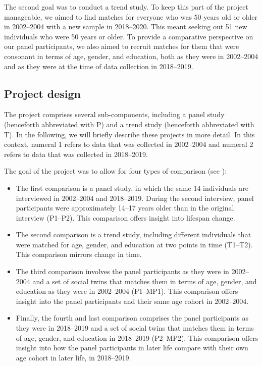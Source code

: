 \documentclass[output=paper]{langscibook}
\begin{document}
The second goal was to conduct a trend study. To keep this part of the project manageable, we aimed to find matches for everyone who was 50 years old or older in 2002--2004 with a new sample in 2018--2020. This meant seeking out 51 new individuals who were 50 years or older. To provide a comparative perspective on our panel participants, we also aimed to recruit matches for them that were consonant in terms of age, gender, and education, both as they were in 2002--2004 and as they were at the time of data collection in 2018--2019.\\

\subsection{Project design}
\label{sec:pabst:3.2}

The project comprises several sub-components, including a panel study (henceforth abbreviated with P) and a trend study (henceforth abbreviated with T). In the following, we will briefly describe these projects in more detail. In this context, numeral 1 refers to data that was collected in 2002--2004 and numeral 2 refers to data that was collected in 2018--2019.



The goal of the project was to allow for four types of comparison (see ):


\begin{itemize}
\item
The first comparison is a panel study, in which the same 14 individuals are interviewed in 2002--2004 and 2018--2019. During the second interview, panel participants were approximately 14--17 years older than in the original interview (P1--P2).  This comparison offers insight into lifespan change.
\item
The second comparison is a trend study, including different individuals that were matched for age, gender, and education at two points in time (T1--T2). This comparison mirrors change in time.
\item
The third comparison involves the panel participants as they were in 2002--2004 and a set of social twins that matches them in terms of age, gender, and education as they were in 2002--2004 (P1--MP1). This comparison offers insight into the panel participants and their same age cohort in 2002--2004.
\item
Finally, the fourth and last comparison comprises the panel participants as they were in 2018--2019 and a set of social twins that matches them in terms of age, gender, and education in 2018--2019 (P2--MP2). This comparison offers insight into how the panel participants in later life compare with their own age cohort in later life, in 2018--2019.
\end{itemize}
\end{document}
